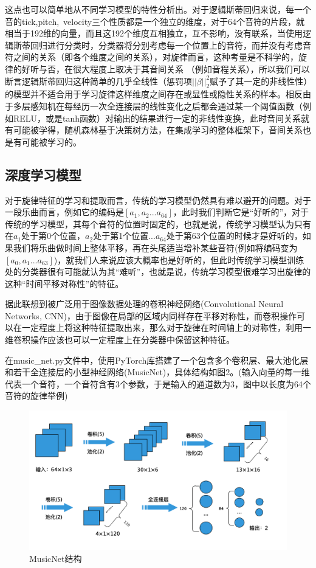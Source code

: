 \documentclass[UTF8,a4paper,10pt]{ctexart}
\begin{document}
这点也可以简单地从不同学习模型的特性分析出。对于逻辑斯蒂回归来说，每一个音的tick,pitch,\  velocity三个性质都是一个独立的维度，对于64个音符的片段，就相当于192维的向量，而且这192个维度互相独立，互不影响，没有联系，当使用逻辑斯蒂回归进行分类时，分类器将分别考虑每一个位置上的音符，而并没有考虑音符之间的关系（即各个维度之间的关系），对旋律而言，这种考量是不科学的，旋律的好听与否，在很大程度上取决于其音间关系 （例如音程关系），所以我们可以断言逻辑斯蒂回归这种简单的几乎全线性（惩罚项$||\beta||_2^2$赋予了其一定的非线性性）的模型并不适合用于学习旋律这样维度之间存在或显性或隐性关系的样本。相反由于多层感知机在每经历一次全连接层的线性变化之后都会通过某一个阈值函数（例如RELU，或是tanh函数）对输出的结果进行一定的非线性变换，此时音间关系就有可能被学得，随机森林基于决策树方法，在集成学习的整体框架下，音间关系也是有可能被学习的。

\subsection{深度学习模型}

对于旋律特征的学习和提取而言，传统的学习模型仍然具有难以避开的问题。对于一段乐曲而言，例如它的编码是$[a_1,a_2...a_{64}]$，此时我们判断它是“好听的”，对于传统的学习模型，其每个音符的位置时固定的，也就是说，传统学习模型认为只有在$a_1$处于第0个位置，$a_2$处于第1个位置...$a_{64}$处于第63个位置的时候才是好听的，如果我们将乐曲做时间上整体平移，再在头尾适当增补某些音符(例如将编码变为$[a_0,a_1...a_{63}]$)，就我们人来说应该大概率也是好听的，但此时传统学习模型训练处的分类器很有可能就认为其“难听”，也就是说，传统学习模型很难学习出旋律的这种“时间平移对称性”的特征。

据此联想到被广泛用于图像数据处理的卷积神经网络(Convolutional Neural Networks, CNN)，由于图像在局部的区域内同样存在平移对称性，而卷积操作可以在一定程度上将这种特征提取出来，那么对于旋律在时间轴上的对称性，利用一维卷积操作应该也可以一定程度上在分类器中保留这种特征。

在music\_net.py文件中，使用PyTorch库搭建了一个包含多个卷积层、最大池化层和若干全连接层的小型神经网络(MusicNet)，具体结构如图2。(输入向量的每一维代表一个音符，一个音符含有3个参数，于是输入的通道数为3，图中以长度为64个音符的旋律举例)
\begin{figure}[H]
\begin{center}
	\includegraphics[width=0.7\columnwidth]{CNN_net_structure.png}
	\caption{MusicNet结构}
\end{center}
\end{figure}
\end{document}
